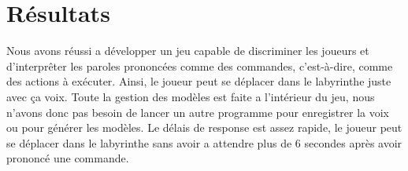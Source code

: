 \section{Résultats}
\label{sec:resultats}

Nous avons réussi a développer un jeu capable de discriminer les joueurs et d'interprêter les paroles prononcées comme des commandes, c'est-à-dire, comme des actions à exécuter.
Ainsi, le joueur peut se déplacer dans le labyrinthe juste avec ça voix. Toute la gestion des modèles est faite a l'intérieur du jeu,
nous n'avons donc pas besoin de lancer un autre programme pour enregistrer la voix ou pour générer les modèles.
Le délais de response est assez rapide, le joueur peut se déplacer dans le labyrinthe sans avoir a attendre plus de 6 secondes
après avoir prononcé une commande.


